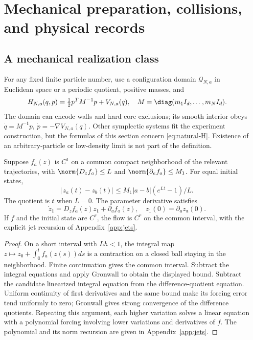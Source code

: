 \section{Mechanical preparation, collisions, and physical records}\label{sec:mechanics}
\subsection{A mechanical realization class}
For any fixed finite particle number, use a configuration domain $\mathcal Q_{N,a}$ in Euclidean space or a periodic quotient, positive masses, and
\begin{equation}
 H_{N,a}(q,p)=\tfrac12p^TM^{-1}p+V_{N,a}(q),
 \quad M=\diag(m_1I_d,\ldots,m_NI_d).
 \label{eq:natural-H}
\end{equation}
The domain can encode walls and hard-core exclusions; its smooth interior obeys
$\dot q=M^{-1}p$, $\dot p=-\nabla V_{N,a}(q)$. Other symplectic systems fit the experiment construction, but the formulas of this section concern \eqref{eq:natural-H}. Existence of an arbitrary-particle or low-density limit is not part of the definition.

\begin{lemma}\label{lem:flow}
Suppose $f_a(z)$ is $C^1$ on a common compact neighborhood of the relevant trajectories, with $\norm{D_zf_a}\le L$ and $\norm{\partial_af_a}\le M_1$. For equal initial states,
\[
 |z_a(t)-z_b(t)|\le M_1|a-b|(e^{Lt}-1)/L.
\]
The quotient is $t$ when $L=0$. The parameter derivative satisfies
\[
 \dot z_1=D_zf_a(z)z_1+\partial_af_a(z),
 \quad z_1(0)=\partial_az_a(0).
\]
If $f$ and the initial state are $C^r$, the flow is $C^r$ on the common interval, with the explicit jet recursion of Appendix~\ref{app:jets}.
\end{lemma}
\begin{proof}
On a short interval with $Lh<1$, the integral map
$z\mapsto z_0+\int_0^tf_a(z(s))ds$ is a contraction on a closed ball staying in the neighborhood. Finite continuation gives the common interval. Subtract the integral equations and apply Gronwall to obtain the displayed bound. Subtract the candidate linearized integral equation from the difference-quotient equation. Uniform continuity of first derivatives and the same bound make its forcing error tend uniformly to zero; Gronwall gives strong convergence of the difference quotients. Repeating this argument, each higher variation solves a linear equation with a polynomial forcing involving lower variations and derivatives of $f$. The polynomial and its norm recursion are given in Appendix~\ref{app:jets}.
\end{proof}

